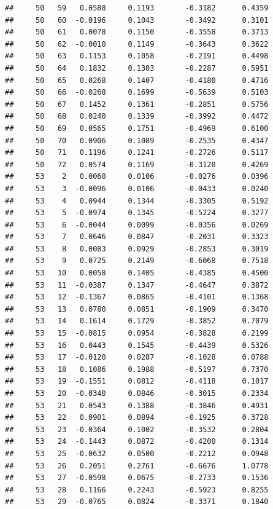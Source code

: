 \documentclass[
]{article}
\begin{document}
\begin{verbatim}
##     50   59   0.0588     0.1193       -0.3182      0.4359  
##     50   60  -0.0196     0.1043       -0.3492      0.3101  
##     50   61   0.0078     0.1150       -0.3558      0.3713  
##     50   62  -0.0010     0.1149       -0.3643      0.3622  
##     50   63   0.1153     0.1058       -0.2191      0.4498  
##     50   64   0.1832     0.1303       -0.2287      0.5951  
##     50   65   0.0268     0.1407       -0.4180      0.4716  
##     50   66  -0.0268     0.1699       -0.5639      0.5103  
##     50   67   0.1452     0.1361       -0.2851      0.5756  
##     50   68   0.0240     0.1339       -0.3992      0.4472  
##     50   69   0.0565     0.1751       -0.4969      0.6100  
##     50   70   0.0906     0.1089       -0.2535      0.4347  
##     50   71   0.1196     0.1241       -0.2726      0.5117  
##     50   72   0.0574     0.1169       -0.3120      0.4269  
##     53    2   0.0060     0.0106       -0.0276      0.0396  
##     53    3  -0.0096     0.0106       -0.0433      0.0240  
##     53    4   0.0944     0.1344       -0.3305      0.5192  
##     53    5  -0.0974     0.1345       -0.5224      0.3277  
##     53    6  -0.0044     0.0099       -0.0356      0.0269  
##     53    7   0.0646     0.0847       -0.2031      0.3323  
##     53    8   0.0083     0.0929       -0.2853      0.3019  
##     53    9   0.0725     0.2149       -0.6068      0.7518  
##     53   10   0.0058     0.1405       -0.4385      0.4500  
##     53   11  -0.0387     0.1347       -0.4647      0.3872  
##     53   12  -0.1367     0.0865       -0.4101      0.1368  
##     53   13   0.0780     0.0851       -0.1909      0.3470  
##     53   14   0.1614     0.1729       -0.3852      0.7079  
##     53   15  -0.0815     0.0954       -0.3828      0.2199  
##     53   16   0.0443     0.1545       -0.4439      0.5326  
##     53   17  -0.0120     0.0287       -0.1028      0.0788  
##     53   18   0.1086     0.1988       -0.5197      0.7370  
##     53   19  -0.1551     0.0812       -0.4118      0.1017  
##     53   20  -0.0340     0.0846       -0.3015      0.2334  
##     53   21   0.0543     0.1388       -0.3846      0.4931  
##     53   22   0.0901     0.0894       -0.1925      0.3728  
##     53   23  -0.0364     0.1002       -0.3532      0.2804  
##     53   24  -0.1443     0.0872       -0.4200      0.1314  
##     53   25  -0.0632     0.0500       -0.2212      0.0948  
##     53   26   0.2051     0.2761       -0.6676      1.0778  
##     53   27  -0.0598     0.0675       -0.2733      0.1536  
##     53   28   0.1166     0.2243       -0.5923      0.8255  
##     53   29  -0.0765     0.0824       -0.3371      0.1840  

\end{verbatim}
\end{document}
